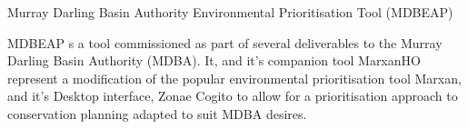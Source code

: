 \documentclass{portfolio}
\begin{document}
\begin{Projects}
\begin{Project}{Murray Darling Basin Authority Environmental Prioritisation Tool (MDBEAP)}
      \begin{ProjectOverview}
        MDBEAP s a tool commissioned as part of several deliverables to the Murray Darling Basin Authority (MDBA).  It, and it's companion tool MarxanHO
        represent a modification of the popular environmental prioritisation tool Marxan, and it's Desktop interface, Zonae Cogito to allow for a 
        prioritisation approach to conservation planning adapted to suit MDBA desires.  
      \end{ProjectOverview}
    \end{Project}
  \end{Projects}
  \vfillForced
\end{document}
